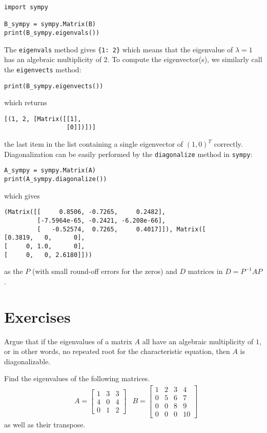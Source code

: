 \begin{lstlisting}
import sympy

B_sympy = sympy.Matrix(B)
print(B_sympy.eigenvals())
\end{lstlisting}
The \verb|eigenvals| method gives \verb|{1: 2}| which means that the eigenvalue of $\lambda = 1$ has an algebraic multiplicity of $2$. To compute the eigenvector(s), we similarly call the \verb|eigenvects| method:
\begin{lstlisting}
print(B_sympy.eigenvects())    
\end{lstlisting}
which returns 
\begin{lstlisting}
[(1, 2, [Matrix([[1],
                 [0]])])]
\end{lstlisting}
the last item in the list containing a single eigenvector of $(1,0)^T$ correctly. Diagonalization can be easily performed by the \verb|diagonalize| method in \texttt{sympy}:
\begin{lstlisting}
A_sympy = sympy.Matrix(A)
print(A_sympy.diagonalize())    
\end{lstlisting}
which gives
\begin{lstlisting}
(Matrix([[     0.8506, -0.7265,     0.2482],
         [-7.5964e-65, -0.2421, -6.208e-66],
         [   -0.52574,  0.7265,     0.4017]]), Matrix([
[0.3819,   0,      0],
[     0, 1.0,      0],
[     0,   0, 2.6180]]))
\end{lstlisting}
as the $P$ (with small round-off errors for the zeros) and $D$ matrices in $D = P^{-1}AP$.

\section{Exercises}

\begin{Exercise}
Argue that if the eigenvalues of a matrix $A$ all have an algebraic multiplicity of $1$, or in other words, no repeated root for the characteristic equation, then $A$ is diagonalizable. 
\end{Exercise}

\begin{Exercise}
Find the eigenvalues of the following matrices.
\begin{align*}
&A =
\begin{bmatrix}
1 & 3 & 3\\
4 & 0 & 4\\
0 & 1 & 2
\end{bmatrix}
&B =
\begin{bmatrix}
1 & 2 & 3 & 4\\
0 & 5 & 6 & 7\\
0 & 0 & 8 & 9\\
0 & 0 & 0 & 10
\end{bmatrix}
\end{align*}
as well as their transpose.
\end{Exercise}

